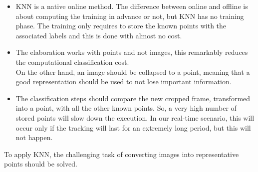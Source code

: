 \begin{itemize}
	\item KNN is a native online method. The difference between online and offline is about computing the training in advance or not, but KNN has no training phase. The training only requires to store the known points with the associated labels and this is done with almost no cost.
	\item The elaboration works with points and not images, this remarkably reduces the computational classification cost.\\
	On the other hand, an image should be collapsed to a point, meaning that a good representation should be used to not lose important information.
	\item The classification steps should compare the new cropped frame, transformed into a point, with all the other known points. So, a very high number of stored points will slow down the execution. In our real-time scenario, this will occur only if the tracking will last for an extremely long period, but this will not happen.
\end{itemize}
To apply KNN, the challenging task of converting images into representative points should be solved.
